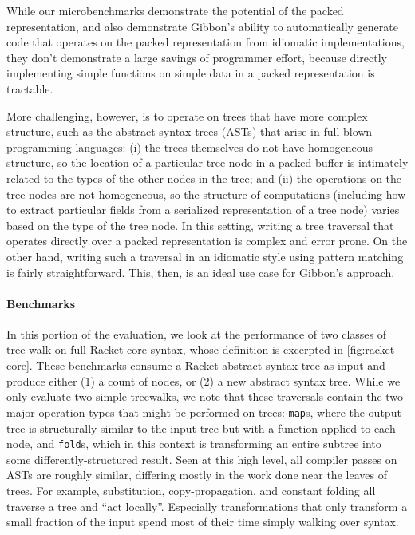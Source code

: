 \documentclass[a4paper,english]{lipics-v2016}
\newcommand{\treelang}{Gibbon\xspace} %
\begin{document}
While our microbenchmarks demonstrate the potential of the packed
representation, and also demonstrate \treelang{}'s ability to automatically
generate code that operates on the packed representation from idiomatic
implementations, they don't demonstrate a large savings of programmer effort,
because directly implementing simple functions on simple data in a packed
representation is tractable.

More challenging, however, is to operate on trees that have more complex
structure, such as the abstract syntax trees (ASTs) that arise in full blown
programming languages: (i) the trees themselves do not have homogeneous structure, so the
location of a particular tree node in a packed buffer is intimately related to
the types of the other nodes in the tree; and (ii) the operations on the tree
nodes are not homogeneous, so the structure of computations (including how to
extract particular fields from a serialized representation of a tree node)
varies based on the type of the tree node. In this setting, writing a tree
traversal that operates directly over a packed representation is complex and
error prone. On the other hand, writing such a traversal in an idiomatic style
using pattern matching is fairly straightforward. This, then, is an ideal use
case for \treelang{}'s approach.

\paragraph*{Benchmarks}
In this portion of the evaluation, we look at
the performance of two classes of tree walk
on full Racket core syntax, 
whose definition is excerpted in \cref{fig:racket-core}.
%
These benchmarks consume a Racket abstract syntax tree as input and produce
either (1) a count of nodes, or (2) a new abstract syntax tree.
%
While we only evaluate two simple treewalks,
we note that these traversals contain the two major operation
types that might be performed on trees: {\tt map}s, where the output tree is
structurally similar to the input tree but with a function applied to each node,
and {\tt fold}s, which in this context is transforming an entire subtree into
some differently-structured result.
%
Seen at this high level, all compiler passes on ASTs
are roughly similar, differing mostly in the work done near the leaves of
trees.
%
For example, substitution, copy-propagation, and constant folding all traverse a
tree and ``act locally''.  Especially transformations that only transform a
small fraction of the input spend most of their time simply walking over syntax.
%
\end{document}
